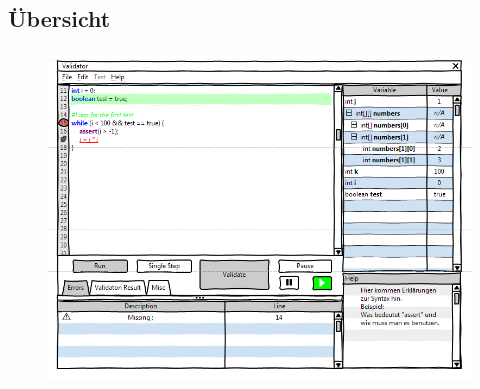 \documentclass[a4paper,10pt]{article}
\begin{document}
\subsection{Übersicht}
\begin{figure}[h!]
\includegraphics[width=\textwidth]{images/mockupf.png}
\end{figure}
\end{document}
